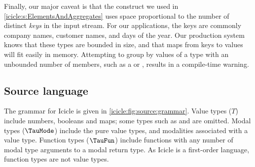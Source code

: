 Finally, our major caveat is that the \Ic@group@ construct we used in \cref{icicle:s:ElementsAndAggregates} uses space proportional to the number of distinct \emph{keys} in the input stream.
For our applications, the keys are commonly company names, customer names, and days of the year.
Our production system knows that these types are bounded in size, and that maps from keys to values will fit easily in memory.
Attempting to group by values of a type with an unbounded number of members, such as a \Ic@Real@ or \Ic@String@, results in a compile-time warning.



\subsection{Source language}
\label{icicle:s:IcicleSource}

The grammar for Icicle is given in \cref{icicle:fig:source:grammar}.
Value types ($T$) include numbers, booleans and maps; some types such as \Ic@Real@ and \Ic@String@ are omitted.
Modal types ($\TauMode$) include the pure value types, and modalities associated with a value type.
Function types ($\TauFun$) include functions with any number of modal type arguments to a modal return type.
As Icicle is a first-order language, function types are not value types.


